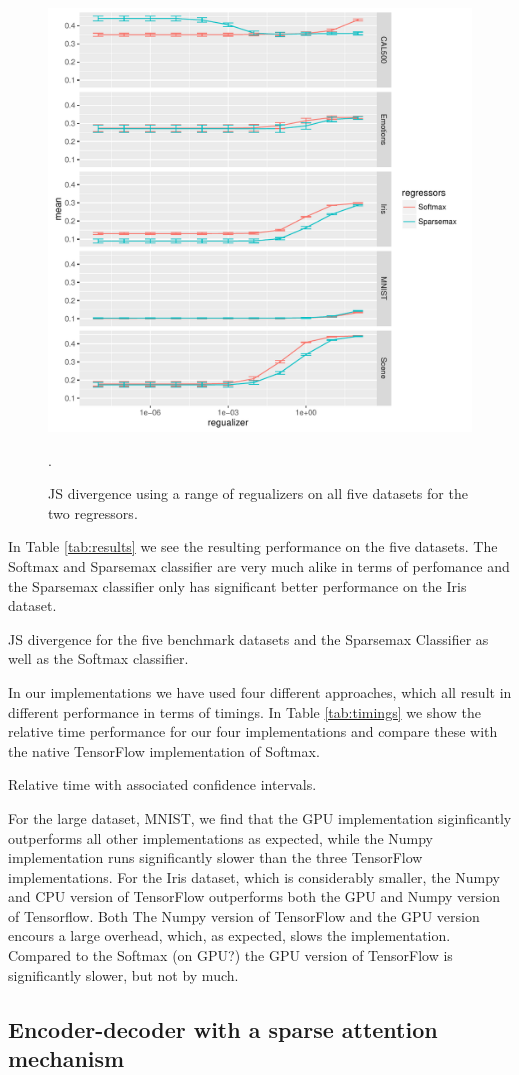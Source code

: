 \begin{figure}[H]
	\centering
	\includegraphics[width=\columnwidth]{figures/hyperparameter.pdf}
\caption{JS divergence using a range of regualizers on all five datasets for the two regressors.}
\label{fig:hyperparameters}.
\end{figure}
In Table \ref{tab:results} we see the resulting performance on the five datasets. The Softmax and Sparsemax classifier are very much alike in terms of perfomance and the Sparsemax classifier only has significant better performance on the Iris dataset.
\begin{table}[H]
\centering

\caption{JS divergence for the five benchmark datasets and the Sparsemax Classifier as well as the Softmax classifier.}
\label{tab:results}
\end{table}
In our implementations we have used four different approaches, which all result in different performance in terms of timings. In Table \ref{tab:timings} we show the relative time performance for our four implementations and compare these with the native TensorFlow implementation of Softmax. 
\begin{table}
\centering

\caption{Relative time with associated confidence intervals.}
\label{tab:timings}
\end{table}
For the large dataset, MNIST, we find that the GPU implementation siginficantly outperforms all other implementations as expected, while the Numpy implementation runs significantly slower than the three TensorFlow implementations. For the Iris dataset, which is considerably smaller, the Numpy and CPU version of TensorFlow outperforms both the GPU and Numpy version of Tensorflow. Both The Numpy version of TensorFlow and the GPU version encours a large overhead, which, as expected, slows the implementation. Compared to the Softmax (on GPU?) the GPU version of TensorFlow is significantly slower, but not by much.
\subsection{Encoder-decoder with a sparse attention mechanism}




